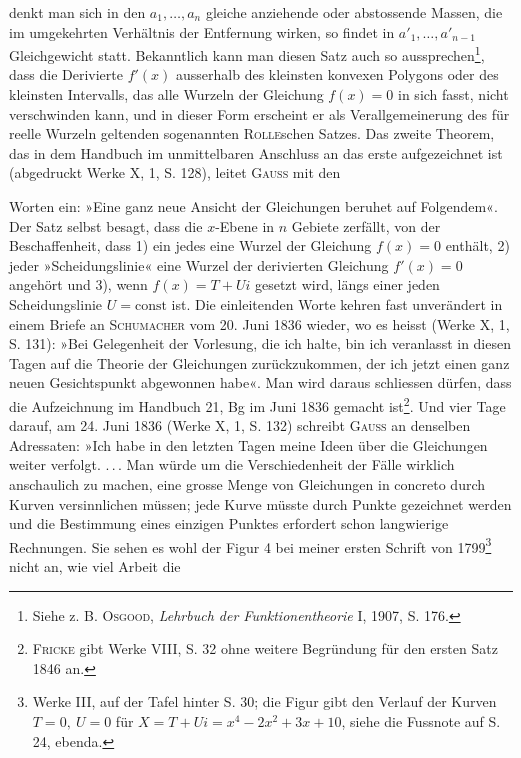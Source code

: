 denkt man sich in den \(a_1,\ldots,a_n\) gleiche anziehende oder abstossende Massen,
die im umgekehrten Verhältnis der Entfernung wirken, so findet in \(a'_1,\ldots,a'_{n-1}\)
Gleichgewicht statt. Bekanntlich kann man diesen Satz auch so aussprechen\footnote{Siehe z. B. \textsc{Osgood}, \textit{Lehrbuch der Funktionentheorie} I, 1907, S. 176.},
dass die Derivierte \(f'(x)\) ausserhalb des kleinsten konvexen Polygons oder des
kleinsten Intervalls, das alle Wurzeln der Gleichung \(f(x)=0\) in sich fasst,
nicht verschwinden kann, und in dieser Form erscheint er als Verallgemeinerung
des für reelle Wurzeln geltenden sogenannten \textsc{Rolle}schen Satzes. Das
zweite Theorem, das in dem Handbuch im unmittelbaren Anschluss an das
erste aufgezeichnet ist (abgedruckt Werke X, 1, S. 128), leitet \textsc{Gauss} mit den
\par\clearpage{}
\noindent Worten ein: »Eine ganz neue Ansicht der Gleichungen beruhet auf Folgendem«.
Der Satz selbst besagt, dass die \(x\)-Ebene in \(n\) Gebiete zerfällt, von der Beschaffenheit,
dass 1) ein jedes eine Wurzel der Gleichung \(f(x)=0\) enthält,
2) jeder »Scheidungslinie« eine Wurzel der derivierten Gleichung \(f'(x)=0\)
angehört und 3), wenn \(f(x)=T+Ui\) gesetzt wird, längs einer jeden Scheidungslinie
\(U=\mathrm{const}\) ist. Die einleitenden Worte kehren fast unverändert
in einem Briefe an \textsc{Schumacher} vom 20. Juni 1836 wieder, wo es heisst
(Werke X, 1, S. 131): »Bei Gelegenheit der Vorlesung, die ich halte, bin ich
veranlasst in diesen Tagen auf die Theorie der Gleichungen zurückzukommen,
der ich jetzt einen ganz neuen Gesichtspunkt abgewonnen habe«. Man wird
daraus schliessen dürfen, dass die Aufzeichnung im Handbuch 21, Bg im Juni
1836 gemacht ist\footnote{\textsc{Fricke} gibt Werke VIII, S. 32 ohne weitere Begründung für den ersten Satz 1846 an.}. Und vier Tage darauf, am 24. Juni 1836 (Werke X, 1,
S. 132) schreibt \textsc{Gauss} an denselben Adressaten: »Ich habe in den letzten Tagen
meine Ideen über die Gleichungen weiter verfolgt. \mbox{.\,.\,.} Man würde um die
Verschiedenheit der Fälle wirklich anschaulich zu machen, eine grosse Menge
von Gleichungen in concreto durch Kurven versinnlichen müssen; jede Kurve
müsste durch Punkte gezeichnet werden und die Bestimmung eines einzigen
Punktes erfordert schon langwierige Rechnungen. Sie sehen es wohl der
Figur 4 bei meiner ersten Schrift von 1799\footnote{Werke III, auf der Tafel hinter S. 30; die Figur gibt den Verlauf der Kurven \(T=0,\ U=0\) für \(X=T+Ui=x^4-2x^2+3x+10\), siehe die Fussnote auf S. 24, ebenda.} nicht an, wie viel Arbeit die
